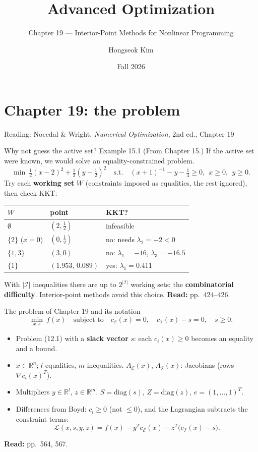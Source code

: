 \documentclass[aspectratio=169,12pt]{beamer}
\title{Advanced Optimization}
\subtitle{Chapter 19 --- Interior-Point Methods for Nonlinear Programming}
\author{Hongseok Kim}
\institute{Department of Electronic Engineering, Sogang University}
\date{Fall 2026}
\newcommand{\R}{\mathbb{R}}
\newcommand{\readbook}[1]{{\color{red}\textbf{Read:} #1}}
\newcommand{\cE}{\mathcal{E}}
\newcommand{\cI}{\mathcal{I}}
\newcommand{\cL}{\mathcal{L}}
\newcommand{\Ae}{A_{\cE}}
\newcommand{\Ai}{A_{\cI}}
\newcommand{\from}[1]{{\small(From #1.)}}
\begin{document}
\section{Chapter 19: the problem}

\begin{frame}
  \titlepage
  \begin{center}\small
    Reading: Nocedal \& Wright, \emph{Numerical Optimization}, 2nd ed., Chapter 19
  \end{center}
\end{frame}

\begin{frame}{Why not guess the active set? Example 15.1 \from{Chapter 15}}
  If the active set were known, we would solve an equality-constrained problem.
  \[ \min\ \tfrac12(x-2)^{2}+\tfrac12(y-\tfrac12)^{2}\quad\text{s.t.}\quad
     (x+1)^{-1}-y-\tfrac14\ge 0,\ \ x\ge 0,\ \ y\ge 0 . \tag{15.5} \]
  Try each \textbf{working set} $W$ (constraints imposed as equalities, the rest ignored), then check KKT:
  \begin{center}\small\setlength\tabcolsep{7pt}
  \begin{tabular}{lll}
    \toprule
    $W$ & point & KKT? \\
    \midrule
    $\emptyset$ & $(2,\tfrac12)$ & infeasible \\
    $\{2\}$ ($x=0$) & $(0,\tfrac12)$ & no: needs $\lambda_{2}=-2<0$ \\
    $\{1,3\}$ & $(3,0)$ & no: $\lambda_{1}=-16$, $\lambda_{3}=-16.5$ \\
    $\{1\}$ & $(1.953,\,0.089)$ & yes: $\lambda_{1}=0.411$ \\
    \bottomrule
  \end{tabular}
  \end{center}
  With $|\cI|$ inequalities there are up to $2^{|\cI|}$ working sets: the \textbf{combinatorial difficulty}.
  Interior-point methods avoid this choice. \readbook{pp.~424--426.}
\end{frame}

\begin{frame}{The problem of Chapter 19 and its notation}
  \[ \min_{x,s}\ f(x)\quad\text{subject to}\quad c_{\cE}(x)=0,\quad c_{\cI}(x)-s=0,\quad s\ge 0 . \tag{19.1} \]
  \begin{itemize}\setlength\itemsep{0.3em}
    \item Problem (12.1) with a \textbf{slack vector} $s$: each $c_{i}(x)\ge 0$ becomes an equality and a bound.
    \item $x\in\R^{n}$; $l$ equalities, $m$ inequalities. $\Ae(x)$, $\Ai(x)$: Jacobians (rows $\nabla c_{i}(x)^{T}$).
    \item Multipliers $y\in\R^{l}$, $z\in\R^{m}$. $S=\mathrm{diag}(s)$, $Z=\mathrm{diag}(z)$, $e=(1,\dots,1)^{T}$.
    \item Differences from Boyd: $c_{i}\ge 0$ (not $\le 0$), and the Lagrangian subtracts the constraint terms:
      \[ \cL(x,s,y,z)=f(x)-y^{T}c_{\cE}(x)-z^{T}\bigl(c_{\cI}(x)-s\bigr) . \tag{19.7} \]
  \end{itemize}
  \readbook{pp.~564, 567.}
\end{frame}
\end{document}

